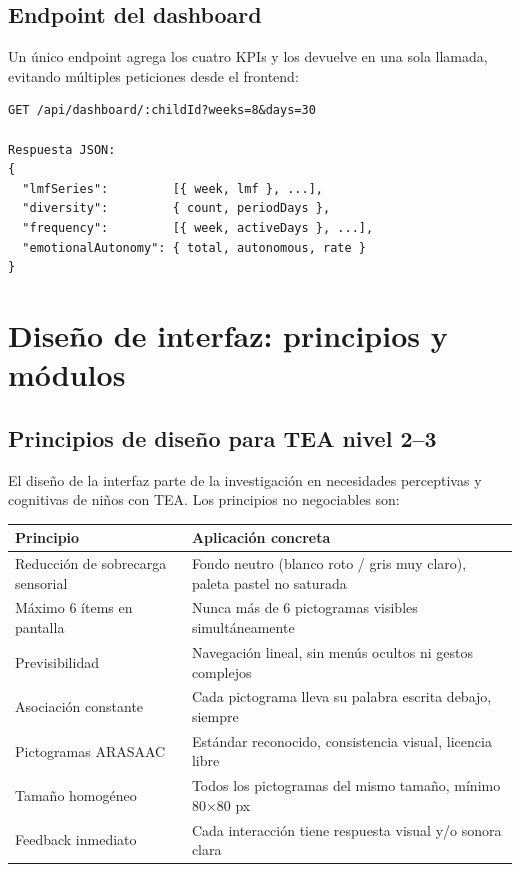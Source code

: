 \documentclass[12pt, a4paper]{article}
\begin{document}
\subsection{Endpoint del dashboard}

Un único endpoint agrega los cuatro KPIs y los devuelve en una sola llamada, evitando múltiples peticiones desde el frontend:

\begin{cajatecnica}[]
\begin{lstlisting}
GET /api/dashboard/:childId?weeks=8&days=30

Respuesta JSON:
{
  "lmfSeries":         [{ week, lmf }, ...],
  "diversity":         { count, periodDays },
  "frequency":         [{ week, activeDays }, ...],
  "emotionalAutonomy": { total, autonomous, rate }
}
\end{lstlisting}
\end{cajatecnica}

\section{Diseño de interfaz: principios y módulos}

\subsection{Principios de diseño para TEA nivel 2--3}

El diseño de la interfaz parte de la investigación en necesidades perceptivas y cognitivas de niños con TEA. Los principios no negociables son:

\begin{tabular}{L{4cm} L{10cm}}
\toprule
\textbf{Principio} & \textbf{Aplicación concreta} \\
\midrule
Reducción de sobrecarga sensorial & Fondo neutro (blanco roto / gris muy claro), paleta pastel no saturada \\
Máximo 6 ítems en pantalla & Nunca más de 6 pictogramas visibles simultáneamente \\
Previsibilidad & Navegación lineal, sin menús ocultos ni gestos complejos \\
Asociación constante & Cada pictograma lleva su palabra escrita debajo, siempre \\
Pictogramas ARASAAC & Estándar reconocido, consistencia visual, licencia libre \\
Tamaño homogéneo & Todos los pictogramas del mismo tamaño, mínimo 80×80 px \\
Feedback inmediato & Cada interacción tiene respuesta visual y/o sonora clara \\
\bottomrule
\end{tabular}
\end{document}
